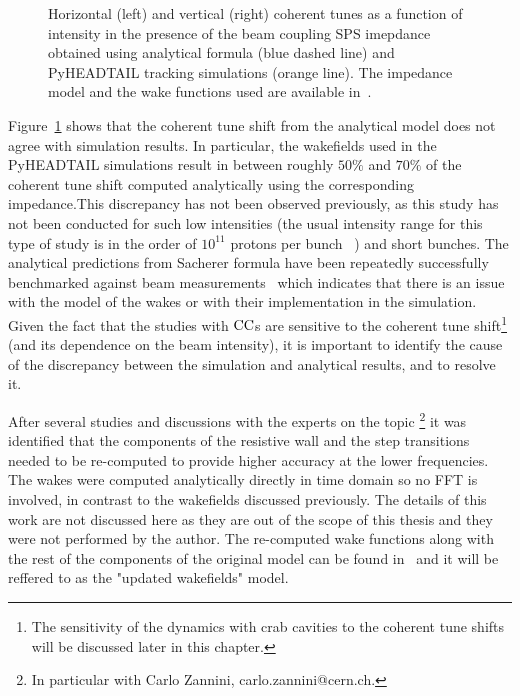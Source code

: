 \begin{figure}[!ht]
\begin{subfigure}[t]{0.45\textwidth}
    \end{subfigure}
    \hfill
     \caption{Horizontal (left) and vertical (right) coherent tunes as a function of intensity in the presence of the beam coupling SPS imepdance obtained using analytical formula (blue dashed line) and PyHEADTAIL tracking simulations (orange line). The impedance model and the wake functions used are available in~\cite{sps_impedance_model_git}.} %
     \label{fig:sps_coherent_DQ_vs_intensity_original_complete_model}
 \end{figure}

 Figure~\ref{fig:sps_coherent_DQ_vs_intensity_original_complete_model} shows that the coherent tune shift from the analytical model does not agree with simulation results. In particular, the wakefields used in the PyHEADTAIL simulations result in between roughly $50\%$ and $70\%$ of the coherent tune shift computed analytically using the corresponding impedance.This discrepancy has not been observed previously, as this study has not been conducted for such low intensities (the usual intensity range for this type of study is in the order of $10^{11}$ protons per bunch ~\cite{Beck:2683038}) and short bunches. %
 The analytical predictions from Sacherer formula have been repeatedly successfully benchmarked against beam measurements~\cite{Bartosik:1742183, sps_impedance_measurements_vs_model} which indicates that there is an issue with the model of the wakes or with their implementation in the simulation. Given the fact that the studies with ${\mathrm{CC}}$s are sensitive to the coherent tune shift\footnote{The sensitivity of the dynamics with crab cavities to the coherent tune shifts will be discussed later in this chapter.} (and its dependence on the beam intensity), it is important to identify the cause of the discrepancy between the simulation and analytical results, and to resolve it.

 After several studies and discussions with the experts on the topic \footnote{In particular with Carlo Zannini, carlo.zannini@cern.ch.} it was identified that the components of the resistive wall and the step transitions needed to be re-computed to provide higher accuracy at the lower frequencies. The wakes were computed analytically directly in time domain so no FFT is involved, in contrast to the wakefields discussed previously. 
 The details of this work are not discussed here as they are out of the scope of this thesis and they were not performed by the author. The re-computed wake functions along with the rest of the components of the original model can be found in~\cite{updated_sps_wakfields_model} and it will be reffered to as the "updated wakefields" model.

